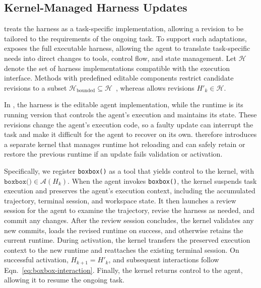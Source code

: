 
\subsection{Kernel-Managed Harness Updates}
\label{sec:boxbox-mechanism}

\boxbox{} treats the harness as a task-specific implementation, allowing a revision to be tailored to the requirements of the ongoing task. To support such adaptations, \boxbox{} exposes the full executable harness, allowing the agent to translate task-specific needs into direct changes to tools, control flow, and state management. Let $\mathcal{H}$ denote the set of harness implementations compatible with the execution interface. Methods with predefined editable components restrict candidate revisions to a subset $\mathcal{H}_{\mathrm{bounded}}\subseteq\mathcal{H}$~\citep{zhang2026selfharness,lin2026agentic,park2026autosaddler}, whereas \boxbox{} allows revisions $H'_k\in\mathcal{H}$.

In \boxbox{}, the harness is the editable agent implementation, while the runtime is its running version that controls the agent's execution and maintains its state. These revisions change the agent's execution code, so a faulty update can interrupt the task and make it difficult for the agent to recover on its own. \boxbox{} therefore introduces a separate kernel that manages runtime hot reloading and can safely retain or restore the previous runtime if an update fails validation or activation.

Specifically, we register \texttt{boxbox()} as a tool that yields control to the kernel, with $\texttt{boxbox()}\in\mathcal{A}(H_k)$. When the agent invokes \texttt{boxbox()}, the kernel suspends task execution and preserves the agent's execution context, including the accumulated trajectory, terminal session, and workspace state. It then launches a review session for the agent to examine the trajectory, revise the harness as needed, and commit any changes. After the review session concludes, the kernel validates any new commits, loads the revised runtime on success, and otherwise retains the current runtime. During activation, the kernel transfers the preserved execution context to the new runtime and reattaches the existing terminal session. On successful activation, $H_{k+1}=H'_k$, and subsequent interactions follow Eqn.~\ref{eq:boxbox-interaction}. Finally, the kernel returns control to the agent, allowing it to resume the ongoing task.

